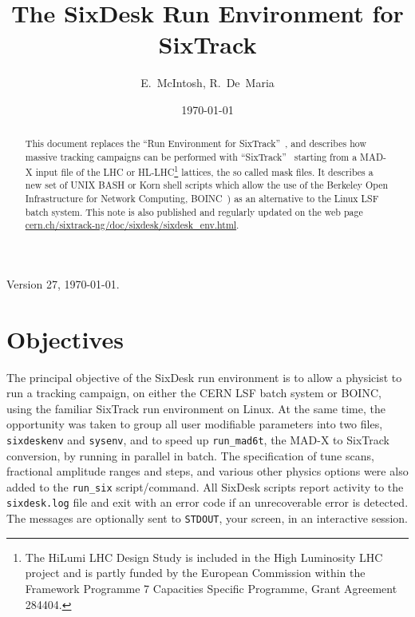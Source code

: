 \documentclass{cernatsnote}
\newcommand{\myhref}[2]{\href{#1}{\color{blue}#2}}
\begin{document}
\begin{titlepage}
\ifx \WEB \undefined
{}
\fi
\date{\today}
\title{The SixDesk Run Environment for SixTrack}
\author{E.~McIntosh, R.~De~Maria}
\ifx \WEB \undefined
{}
\fi

\maketitle

\ifx \WEB \undefined
 \begin{abstract}
 \fi
This document replaces the ``Run Environment for SixTrack''~\cite{Runsix}, and
describes how massive tracking campaigns can be performed with
``SixTrack''~\cite{SixTrack} starting from a MAD-X input file of the LHC
or HL-LHC\footnote{The HiLumi LHC Design Study is included in the High
  Luminosity LHC project and is partly funded by the European Commission
  within the Framework Programme 7 Capacities Specific Programme, Grant
Agreement 284404.} lattices, the so called mask files. It describes a new set
of UNIX BASH or Korn shell scripts which allow the use of the Berkeley Open
Infrastructure for Network Computing, BOINC~\cite{Boinc}) as an alternative to
the Linux LSF batch system. This note is also published and regularly updated
on the web page
\myhref{http://cern.ch/sixtrack-ng/doc/sixdesk/sixdesk_env.html}{cern.ch/sixtrack-ng/doc/sixdesk/sixdesk\_env.html}.
\ifx \WEB \undefined
\end{abstract}
\fi

\end{titlepage}
%
Version 27, \today.

\sloppy
\section{Objectives}
%
The principal objective of the SixDesk run environment is to allow a physicist
to run a tracking campaign, on either the CERN LSF batch system or BOINC, using
the familiar SixTrack run environment on Linux.  At the same time, the
opportunity was taken to group all user modifiable parameters into two files,
\texttt{sixdeskenv} and \texttt{sysenv}, and to speed up \texttt{run\_mad6t}, the MAD-X
to SixTrack conversion, by running in parallel in batch.  The specification of
tune scans, fractional amplitude ranges and steps, and various other physics
options were also added to the \texttt{run\_six} script/command.  All SixDesk
scripts report activity to the \texttt{sixdesk.log} file and exit with an error
code if an unrecoverable error is detected.  The messages are optionally sent
to \texttt{STDOUT}, your screen, in an interactive session.
%
\end{document}
